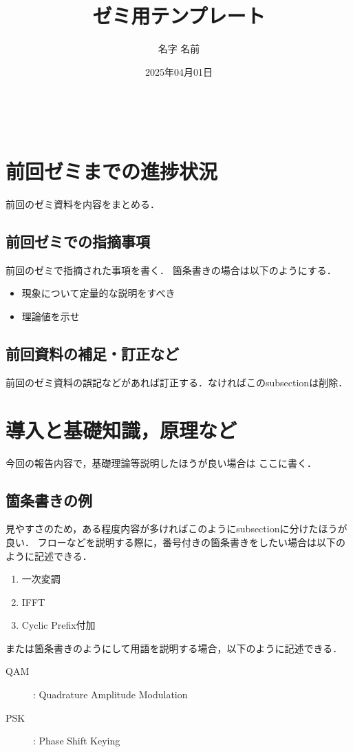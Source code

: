 \documentclass[fleqn, a4paper, twocolumn]{ltjsarticle}
\title{ゼミ用テンプレート}
\date{2025年04月01日}
\author{名字 名前}
\numberwithin{figure}{section}
\numberwithin{table}{section}
\numberwithin{equation}{section}
\begin{document}
\noindent{\textgt{\Large \thetitle}}\\  %
\noindent \theauthor \hfill             %
\thedate                                %

\section{前回ゼミまでの進捗状況}
前回のゼミ資料を内容をまとめる．

\subsection{前回ゼミでの指摘事項}
前回のゼミで指摘された事項を書く．
箇条書きの場合は以下のようにする．
\begin{itemize}
	\item 現象について定量的な説明をすべき
	\item 理論値を示せ
\end{itemize}

\subsection{前回資料の補足・訂正など}
前回のゼミ資料の誤記などがあれば訂正する．なければこのsubsectionは削除．

\section{導入と基礎知識，原理など}
今回の報告内容で，基礎理論等説明したほうが良い場合は
ここに書く．

\subsection{箇条書きの例}
見やすさのため，ある程度内容が多ければこのようにsubsectionに分けたほうが良い．
フローなどを説明する際に，番号付きの箇条書きをしたい場合は以下のように記述できる．
\begin{enumerate}
	\item 一次変調
	\item IFFT
	\item Cyclic Prefix付加
\end{enumerate}
または箇条書きのようにして用語を説明する場合，以下のように記述できる．
\begin{description}
	\item [QAM]: Quadrature Amplitude Modulation
	\item [PSK]: Phase Shift Keying
\end{description}
\end{document}
